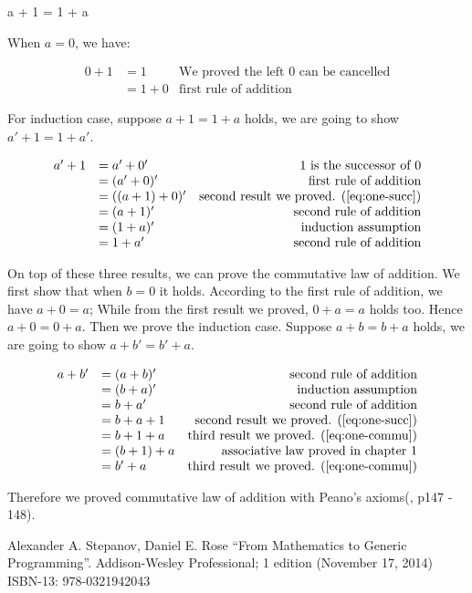\documentclass[UTF8]{article}
\begin{document}
\be
a + 1 = 1 + a
\label{eq:one-commu}
\ee

When $a = 0$, we have:

\[
\begin{array}{rlr}
0 + 1 & = 1 & \text{We proved the left 0 can be cancelled} \\
      & = 1 + 0 & \text{first rule of addition}
\end{array}
\]

For induction case, suppose $a + 1 = 1 + a$ holds, we are going to show $a' + 1 = 1 + a'$.

\[
\begin{array}{rlr}
a' + 1 & = a' + 0' & \text{1 is the successor of 0} \\
       & = (a' + 0)' & \text{first rule of addition} \\
       & = ((a + 1) + 0)' & \text{second result we proved. (\cref{eq:one-succ})} \\
       & = (a + 1)' & \text{second rule of addition} \\
       & = (1 + a)' & \text{induction assumption} \\
       & = 1 + a' & \text{second rule of addition}
\end{array}
\]

On top of these three results, we can prove the commutative law of addition. We first show that when $b = 0$ it holds. According to the first rule of addition, we have $a + 0 = a$; While from the first result we proved, $0 + a = a$ holds too. Hence $a + 0 = 0 + a$. Then we prove the induction case. Suppose $a + b = b + a$ holds, we are going to show $a + b' = b' + a$.

\[
\begin{array}{rlr}
a + b' & = (a + b)' & \text{second rule of addition} \\
       & = (b + a)' & \text{induction assumption} \\
       & = b + a' & \text{second rule of addition} \\
       & = b + a + 1 & \text{second result we proved. (\cref{eq:one-succ})} \\
       & = b + 1 + a & \text{third result we proved. (\cref{eq:one-commu})} \\
       & = (b + 1) + a & \text{associative law proved in chapter 1} \\
       & = b' + a & \text{third result we proved. (\cref{eq:one-commu})}
\end{array}
\]

Therefore we proved commutative law of addition with Peano's axioms(\cite{StepanovRose15}, p147 - 148).

\ifx\wholebook\relax \else
\begin{thebibliography}{99}

Alexander A. Stepanov, Daniel E. Rose ``From Mathematics to Generic Programming''. Addison-Wesley Professional; 1 edition (November 17, 2014) ISBN-13: 978-0321942043

\end{thebibliography}

\expandafter\enddocument

\fi
\end{document}
